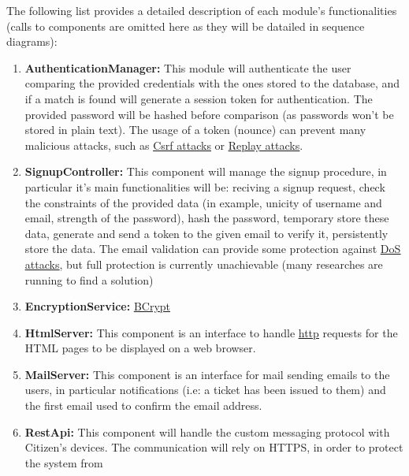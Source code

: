 \documentclass{article}
\newcommand{\enum}[1]{\texttt{#1.\arabic*}}
\newcommand{\link}[2]{{\color{blue}\underline{\href{#1}{#2}}}}
\begin{document}
	\FloatBarrier
	The following list provides a detailed description of each module's functionalities (calls to components are omitted here as they will be
	datailed in sequence diagrams):
	\begin{enumerate}[label=\enum{COMP}]
		\item \label{component:AuthenticationManager} \textbf{AuthenticationManager:}
			This module will authenticate the user comparing the provided credentials with the ones stored to the database, and if a match is found
			will generate a session token for authentication. The provided password will be hashed before comparison (as passwords won't be stored
			in plain text). The usage of a token (nounce) can prevent many malicious attacks, such as 
		 	\link{https://en.wikipedia.org/wiki/Cross-site_request_forgery}{Csrf attacks} or 
			\link{https://en.wikipedia.org/wiki/Replay_attack}{Replay attacks}. 
		 \item \label{component:SignupController} \textbf{SignupController:} 
		 	This component will manage the signup procedure, in particular it's main functionalities will be: reciving a signup request, check the
		 	constraints of the provided data (in example, unicity of username and email, strength of the password), hash the password, temporary store these data, 
		 	generate and send a token to the given email to verify it, persistently store the data. The email validation can provide some protection against
		 	\link{https://en.wikipedia.org/wiki/Denial-of-service_attack}{DoS attacks}, but full protection is
		 	currently unachievable (many researches are running to find a solution)
		 \item \label{component:EncryptionService} \textbf{EncryptionService:}
		 	\link{https://en.wikipedia.org/wiki/Bcrypt}{BCrypt}
		 \item \label{component:HtmlServer} \textbf{HtmlServer:}
		 	This component is an interface to handle \link{https://en.wikipedia.org/wiki/Hypertext_Transfer_Protocol}{http} requests for the HTML pages to be displayed
		 	on a web browser. 
		 \item \label{component:MailServer} \textbf{MailServer:} 
		 	This component is an interface for mail sending emails to the users, in particular notifications (i.e: a ticket has been issued to them) and the first email
		 	used to confirm the email address.
		 \item \label{component:RestApi} \textbf{RestApi:} 
		 	This component will handle the custom messaging protocol with Citizen's devices. The communication will rely on HTTPS, in order to protect the system from 

\end{enumerate}
\end{document}
